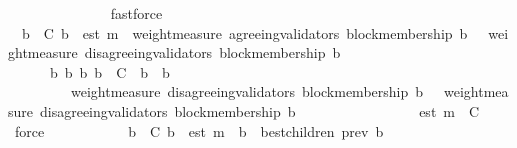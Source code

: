 \begin{isabellebody}
\ \ \ \ \ \ \ \ \ \ {\isacartoucheopen}{\isasymsigma}{\isacharprime}\ {\isasymin}\ {\isasymSigma}{\isacartoucheclose}\ \isamarkupfalse%
\ fastforce\ \ \ \ \ \ \isanewline
\ \ \ \ \isamarkupfalse%
\ {\isachardoublequoteopen}{\isasymforall}\ b{\isacharprime}\ {\isasymin}\ C{\isachardot}\ b{\isacharprime}\ {\isasymdownharpoonright}\ est\ m\ {\isasymlongrightarrow}\ weight{\isacharunderscore}measure\ {\isacharparenleft}agreeing{\isacharunderscore}validators\ {\isacharparenleft}block{\isacharunderscore}membership\ b{\isacharprime}{\isacharcomma}\ {\isasymsigma}{\isacharprime}{\isacharparenright}{\isacharparenright}\ {\isachargreater}\ weight{\isacharunderscore}measure\ {\isacharparenleft}disagreeing{\isacharunderscore}validators\ {\isacharparenleft}block{\isacharunderscore}membership\ b{\isacharprime}{\isacharcomma}\ {\isasymsigma}{\isacharprime}{\isacharparenright}{\isacharparenright}{\isachardoublequoteclose}\isanewline
\ \ \ \ \ \ \isamarkupfalse%
\ {\isacartoucheopen}{\isasymforall}\ {\isasymsigma}\ {\isasymin}\ {\isasymSigma}{\isachardot}\ {\isasymforall}\ b\ b{\isacharprime}{\isachardot}\ {\isacharbraceleft}b{\isacharcomma}\ b{\isacharprime}{\isacharbraceright}\ {\isasymsubseteq}\ C\ {\isasymand}\ b{\isacharprime}\ {\isasymdownharpoonright}\ b\isanewline
\ \ \ \ \ \ \ \ {\isasymlongrightarrow}\ weight{\isacharunderscore}measure\ {\isacharparenleft}disagreeing{\isacharunderscore}validators\ {\isacharparenleft}block{\isacharunderscore}membership\ b{\isacharcomma}\ {\isasymsigma}{\isacharparenright}{\isacharparenright}\ {\isasymge}\ weight{\isacharunderscore}measure\ {\isacharparenleft}disagreeing{\isacharunderscore}validators\ {\isacharparenleft}block{\isacharunderscore}membership\ b{\isacharprime}{\isacharcomma}\ {\isasymsigma}{\isacharparenright}{\isacharparenright}{\isacartoucheclose}\isanewline
\ \ \ \ \ \ \ \ \ \ {\isacartoucheopen}{\isasymsigma}\ {\isasymin}\ {\isasymSigma}{\isacartoucheclose}\ {\isacartoucheopen}{\isasymsigma}{\isacharprime}\ {\isasymin}\ {\isasymSigma}{\isacartoucheclose}\ {\isacartoucheopen}est\ m\ {\isasymin}\ C{\isacartoucheclose}\ \isamarkupfalse%
\ force\isanewline
\ \ \ \ \isanewline
\ \ \ \ \isamarkupfalse%
\ {\isachardoublequoteopen}{\isasymforall}\ b{\isacharprime}\ {\isasymin}\ C{\isachardot}\ b{\isacharprime}\ {\isasymdownharpoonright}\ est\ m\ {\isasymlongrightarrow}\ b{\isacharprime}\ {\isasymin}\ best{\isacharunderscore}children\ {\isacharparenleft}prev\ b{\isacharprime}{\isacharcomma}\ {\isasymsigma}{\isacharprime}{\isacharparenright}{\isachardoublequoteclose}\isanewline

\end{isabellebody}
